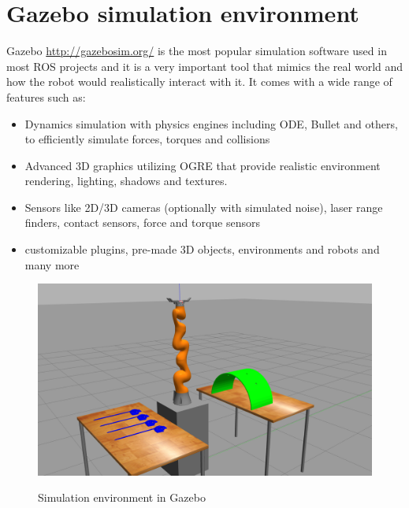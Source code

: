 \section{Gazebo simulation environment}

Gazebo \url{http://gazebosim.org/} is the most popular simulation software used in most ROS projects and it is a very important tool that mimics the real world and how the robot would realistically interact with it. It comes with a wide range of 
features such as:
\begin{itemize}
	\item Dynamics simulation with physics engines including ODE, Bullet and others, to efficiently simulate forces, torques and collisions
	\item Advanced 3D graphics utilizing OGRE that provide realistic environment rendering, lighting, shadows and textures.
	\item Sensors like 2D/3D cameras (optionally with simulated noise), laser range finders, contact sensors, force and torque sensors
	\item customizable plugins, pre-made 3D objects, environments and robots and many more
\end{itemize}

\begin{center}
\begin{figure}[!htb]
\centering
\includegraphics[width=12cm]{images/gazebo-sim1.png}\\
\caption{Simulation environment in Gazebo}
\end{figure}
\end{center}


